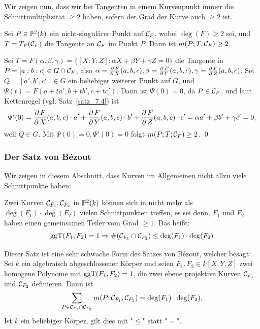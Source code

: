 Wir zeigen nun, dass wir bei Tangenten in einem Kurvenpunkt immer die Schnittmultiplizität $\geq 2$ haben, sofern der Grad der Kurve auch $\geq 2$ ist.
\begin{satz}
\label{satz_9.22}
	Sei $P \in \mathbb{P}^2(k)$ ein nicht-singulärer Punkt auf $\mathcal{C}_F$, wobei $\deg(F) \geq 2$ sei, und $T = T_P(\mathcal{C}_F)$ die Tangente an $\mathcal{C}_F$ im Punkt $P$. Dann ist $m(P;T,\mathcal{C}_F) \geq 2$.
\end{satz}

	Sei $T = F(\alpha,\beta,\gamma) = \{[X:Y:Z] : \alpha X + \beta Y + \gamma Z = 0\}$ die Tangente in $P = [a:b:c] \in G \cap \mathcal{C}_F$, also $\alpha = \frac{\operatorname{\partial} F}{\operatorname{\partial} X}(a,b,c), \beta = \frac{\operatorname{\partial} F}{\operatorname{\partial} Y}(a,b,c), \gamma = \frac{\operatorname{\partial} F}{\operatorname{\partial} Z}(a,b,c)$. Sei $Q = [a',b',c'] \in G$ ein beliebiger weiterer Punkt auf $G$, und $\Psi(t) = F(a+ta',b+tb',c+tc')$. Dann ist $\Psi(0) = 0$, da $P \in \mathcal{C}_F$, und laut Kettenregel (vgl. Satz~\ref{satz_7.4}) ist
	\[ \Psi'(0) = \frac{\operatorname{\partial} F}{\operatorname{\partial} X}(a,b,c) \cdot a' + \frac{\operatorname{\partial} F}{\operatorname{\partial} Y}(a,b,c) \cdot b' + \frac{\operatorname{\partial} F}{\operatorname{\partial} Z}(a,b,c) \cdot c' = \alpha a' + \beta b' + \gamma c' = 0, \]
	weil $Q \in G$. Mit $\Psi(0) = 0, \Psi'(0)=0$ folgt $m(P;T;\mathcal{C}_F) \geq 2$. \qed

\nextlecture	
\subsubsection{Der Satz von Bézout}
\label{subsub:2.3.2}
	Wir zeigen in diesem Abschnitt, dass Kurven im Allgemeinen nicht allzu viele Schnittpunkte haben: \marginnote{[10]}

\begin{satz}
\label{satz_10.1}
	Zwei Kurven $\mathcal{C}_{F_1}, \mathcal{C}_{F_2}$ in $\mathbb{P}^2(k)$ können sich in nicht mehr als $\deg(F_1) \cdot \deg(F_2)$ vielen Schnittpunkten treffen, es sei denn, $F_1$ und $F_2$ haben einen gemeinsamen Teiler vom Grad $\geq 1$. Das heißt: 
	\[ \operatorname{ggT}(F_1,F_2) = 1 \Rightarrow \#(\mathcal{C}_{F_1} \cap \mathcal{C}_{F_2}) \leq \deg(F_1) \cdot \deg(F_2) \]
\end{satz}

\begin{bem}
	Dieser Satz ist eine sehr schwache Form des Satzes von Bézout, welcher besagt: \\
	Sei $k$ ein algebraisch abgeschlossener Körper und seien $F_1,F_2 \in k[X,Y,Z]$ zwei homogene Polynome mit $\operatorname{ggT}(F_1,F_2) = 1$, die zwei ebene projektive Kurven $\mathcal{C}_{F_1}$ und $\mathcal{C}_{F_2}$ definieren. Dann ist
	\[ \sum_{P \in \mathcal{C}_{F_1} \cap \mathcal{C}_{F_2}} m(P;\mathcal{C}_{F_1},\mathcal{C}_{F_2}) = \deg(F_1) \cdot \deg(F_2). \]
	Ist $k$ ein beliebiger Körper, gilt dies mit "$\leq$" statt "$=$".
\end{bem}

